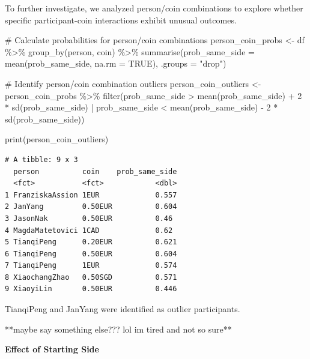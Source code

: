 \documentclass[
  letterpaper,
  DIV=11,
  numbers=noendperiod]{scrartcl}
\newenvironment{Shaded}{\begin{snugshade}}{\end{snugshade}}
\newcommand{\AttributeTok}[1]{\textcolor[rgb]{0.40,0.45,0.13}{#1}}
\newcommand{\CommentTok}[1]{\textcolor[rgb]{0.37,0.37,0.37}{#1}}
\newcommand{\ConstantTok}[1]{\textcolor[rgb]{0.56,0.35,0.01}{#1}}
\newcommand{\DecValTok}[1]{\textcolor[rgb]{0.68,0.00,0.00}{#1}}
\newcommand{\FunctionTok}[1]{\textcolor[rgb]{0.28,0.35,0.67}{#1}}
\newcommand{\NormalTok}[1]{\textcolor[rgb]{0.00,0.23,0.31}{#1}}
\newcommand{\OtherTok}[1]{\textcolor[rgb]{0.00,0.23,0.31}{#1}}
\newcommand{\SpecialCharTok}[1]{\textcolor[rgb]{0.37,0.37,0.37}{#1}}
\newcommand{\StringTok}[1]{\textcolor[rgb]{0.13,0.47,0.30}{#1}}
\begin{document}
To further investigate, we analyzed person/coin combinations to explore
whether specific participant-coin interactions exhibit unusual outcomes.

\begin{Shaded}
\begin{Highlighting}[]
\CommentTok{\# Calculate probabilities for person/coin combinations}
\NormalTok{person\_coin\_probs }\OtherTok{\textless{}{-}}\NormalTok{ df }\SpecialCharTok{\%\textgreater{}\%}
  \FunctionTok{group\_by}\NormalTok{(person, coin) }\SpecialCharTok{\%\textgreater{}\%}
  \FunctionTok{summarise}\NormalTok{(}\AttributeTok{prob\_same\_side =} \FunctionTok{mean}\NormalTok{(prob\_same\_side, }\AttributeTok{na.rm =} \ConstantTok{TRUE}\NormalTok{), }\AttributeTok{.groups =} \StringTok{"drop"}\NormalTok{)}

\CommentTok{\# Identify person/coin combination outliers}
\NormalTok{person\_coin\_outliers }\OtherTok{\textless{}{-}}\NormalTok{ person\_coin\_probs }\SpecialCharTok{\%\textgreater{}\%}
  \FunctionTok{filter}\NormalTok{(prob\_same\_side }\SpecialCharTok{\textgreater{}} \FunctionTok{mean}\NormalTok{(prob\_same\_side) }\SpecialCharTok{+} \DecValTok{2} \SpecialCharTok{*} \FunctionTok{sd}\NormalTok{(prob\_same\_side) }\SpecialCharTok{|}
\NormalTok{           prob\_same\_side }\SpecialCharTok{\textless{}} \FunctionTok{mean}\NormalTok{(prob\_same\_side) }\SpecialCharTok{{-}} \DecValTok{2} \SpecialCharTok{*} \FunctionTok{sd}\NormalTok{(prob\_same\_side))}

\FunctionTok{print}\NormalTok{(person\_coin\_outliers)}
\end{Highlighting}
\end{Shaded}

\begin{verbatim}
# A tibble: 9 x 3
  person          coin    prob_same_side
  <fct>           <fct>            <dbl>
1 FranziskaAssion 1EUR             0.557
2 JanYang         0.50EUR          0.604
3 JasonNak        0.50EUR          0.46 
4 MagdaMatetovici 1CAD             0.62 
5 TianqiPeng      0.20EUR          0.621
6 TianqiPeng      0.50EUR          0.604
7 TianqiPeng      1EUR             0.574
8 XiaochangZhao   0.50SGD          0.571
9 XiaoyiLin       0.50EUR          0.446
\end{verbatim}

TianqiPeng and JanYang were identified as outlier participants.

**maybe say something else??? lol im tired and not so sure**

\textbf{Effect of Starting Side}
\end{document}
